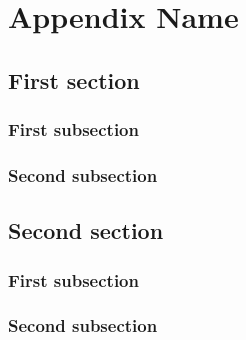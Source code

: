 \chapter{Appendix Name}\label{appendix:1}
\thispagestyle{chapterBeginStyle}
\label{appendix:source-code}

\section{First section}
\subsection{First subsection}
\subsection{Second subsection}

\section{Second section}
\subsection{First subsection}
\subsection{Second subsection}